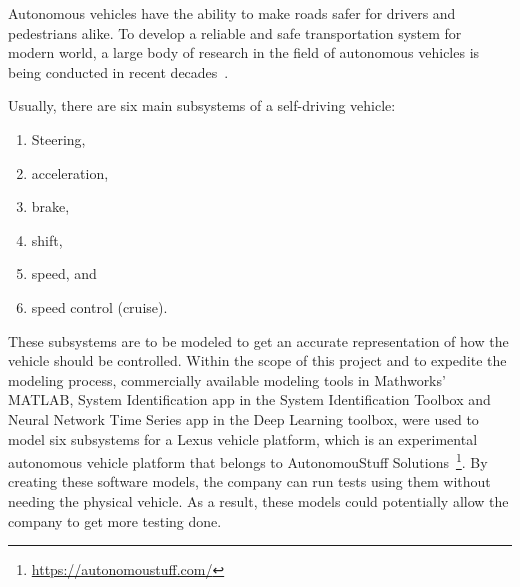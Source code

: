 \documentclass[conference]{IEEEtran}
\begin{document}
%


Autonomous vehicles have the ability to make roads safer for drivers
and pedestrians alike. To develop a reliable and safe transportation system for
modern world, a large body of research in the field of autonomous vehicles is
being conducted in recent decades~\cite{Liu2017,Prasad2020}.


Usually, there are six main subsystems of a self-driving vehicle: %
%
\begin{enumerate}
\item  Steering,

\item acceleration,

\item brake,

\item shift,

\item speed, and

\item speed control (cruise).
\end{enumerate}
%
These subsystems are to be modeled to get an accurate representation of how
the vehicle should be controlled. Within the scope of this project and to expedite the modeling process, commercially available modeling tools in Mathworks' MATLAB, System Identification app in the System Identification Toolbox and Neural Network Time Series app in the Deep Learning toolbox, were used to model six subsystems for a Lexus vehicle platform, which is an experimental autonomous vehicle platform that belongs to AutonomouStuff Solutions~\footnote{\url{https://autonomoustuff.com/}}. By creating these software models, the company can run tests using them without needing the physical vehicle. As a result, these models could potentially allow the company to get more testing done.
\end{document}
